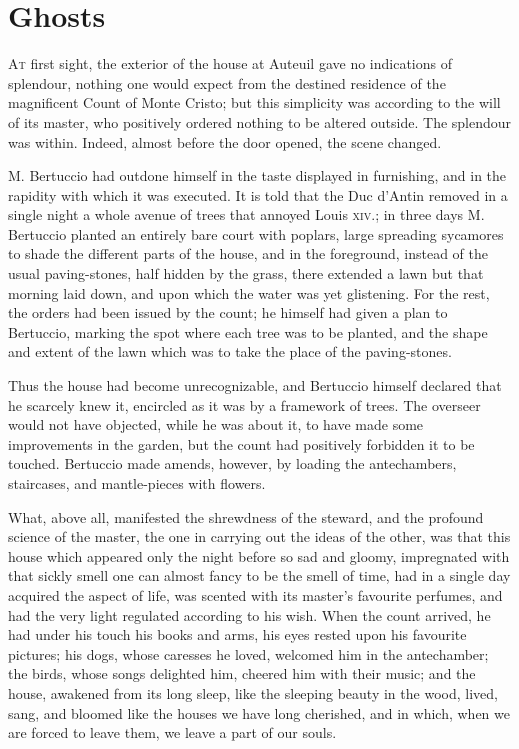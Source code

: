 \chapter{Ghosts} 

 \lettrine{A}{t} first sight, the exterior of the house at Auteuil gave no indications of splendour, nothing one would expect from the destined residence of the magnificent Count of Monte Cristo; but this simplicity was according to the will of its master, who positively ordered nothing to be altered outside. The splendour was within. Indeed, almost before the door opened, the scene changed. 

 M. Bertuccio had outdone himself in the taste displayed in furnishing, and in the rapidity with which it was executed. It is told that the Duc d'Antin removed in a single night a whole avenue of trees that annoyed Louis \textsc{xiv.}; in three days M. Bertuccio planted an entirely bare court with poplars, large spreading sycamores to shade the different parts of the house, and in the foreground, instead of the usual paving-stones, half hidden by the grass, there extended a lawn but that morning laid down, and upon which the water was yet glistening. For the rest, the orders had been issued by the count; he himself had given a plan to Bertuccio, marking the spot where each tree was to be planted, and the shape and extent of the lawn which was to take the place of the paving-stones. 

 Thus the house had become unrecognizable, and Bertuccio himself declared that he scarcely knew it, encircled as it was by a framework of trees. The overseer would not have objected, while he was about it, to have made some improvements in the garden, but the count had positively forbidden it to be touched. Bertuccio made amends, however, by loading the antechambers, staircases, and mantle-pieces with flowers. 

 What, above all, manifested the shrewdness of the steward, and the profound science of the master, the one in carrying out the ideas of the other, was that this house which appeared only the night before so sad and gloomy, impregnated with that sickly smell one can almost fancy to be the smell of time, had in a single day acquired the aspect of life, was scented with its master's favourite perfumes, and had the very light regulated according to his wish. When the count arrived, he had under his touch his books and arms, his eyes rested upon his favourite pictures; his dogs, whose caresses he loved, welcomed him in the antechamber; the birds, whose songs delighted him, cheered him with their music; and the house, awakened from its long sleep, like the sleeping beauty in the wood, lived, sang, and bloomed like the houses we have long cherished, and in which, when we are forced to leave them, we leave a part of our souls. 

